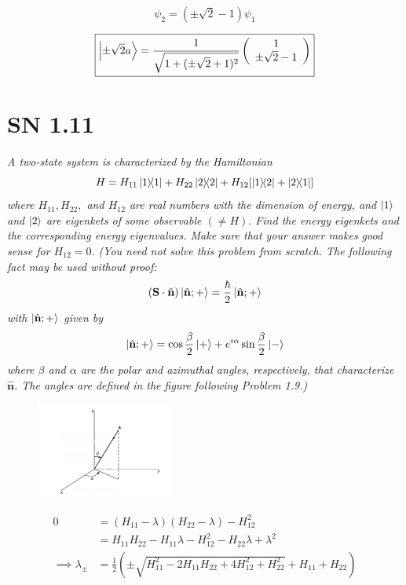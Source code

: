 \documentclass{article}
\begin{document}
\begin{equation*}
    \psi_2 = (\pm \sqrt{2} - 1) \psi_1
\end{equation*}

\begin{equation*}
    \boxed{\ket{\pm \sqrt{2} a} = \frac{1}{\sqrt{1+(\pm \sqrt{2}+1)^{2}}}\left(\begin{array}{c}
1 \\
\pm \sqrt{2}-1
\end{array}\right)}
\end{equation*}




\newpage

\section{SN 1.11}
\textit{A two-state system is characterized by the Hamiltonian
$$
H=H_{11}\ketbra{1}{1}+H_{22}\ketbra{2}{2}+H_{12}[\ketbra{1}{2}+\ketbra{2}{1}]
$$
where $H_{11}, H_{22},$ and $H_{12}$ are real numbers with the dimension of energy, and $\ket{1}$ and $\ket{2}$ are eigenkets of some observable $(\neq H) .$ Find the energy eigenkets and the corresponding energy eigenvalues. Make sure that your answer makes good sense for $H_{12}=0 .$ (You need not solve this problem from scratch. The following fact may be used without proof:
$$
(\mathbf{S} \cdot \hat{\mathbf{n}})\ket{\hat{\mathbf{n}} ;+}=\frac{\hbar}{2}\ket{\hat{\mathbf{n}} ;+}
$$
with $\ket{\hat{\mathbf{n}} ;+}$ given by
$$
\ket{\hat{\mathbf{n}} ;+}=\cos \frac{\beta}{2}\ket{+}+e^{i \alpha} \sin \frac{\beta}{2}\ket{-}
$$
where $\beta$ and $\alpha$ are the polar and azimuthal angles, respectively, that characterize $\hat{\mathbf{n}}$. The angles are defined in the figure following Problem 1.9.)}

\begin{figure}[h!]
    \centering
    \includegraphics[width=0.4\textwidth]{figures/problem5.png}
    \label{fig:my_label}
\end{figure}


\begin{align*}
0&=\left(H_{11}-\lambda\right)\left(H_{22}-\lambda\right)-H_{12}^{2} \\
&=H_{11} H_{22}-H_{11} \lambda -H_{12}^2-H_{22} \lambda +\lambda ^2\\
\implies \lambda_\pm &= \frac{1}{2}\left(\pm\sqrt{H_{11}^2-2 H_{11} H_{22}+4 H_{12}^2+H_{22}^2}+H_{11}+H_{22}\right)
\end{align*}
\end{document}
